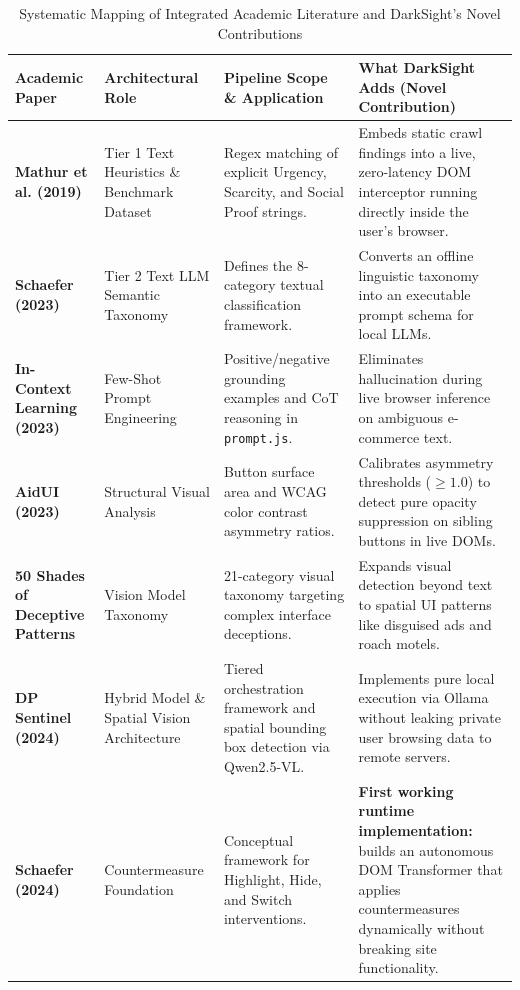 \documentclass[11pt,a4paper]{article}
\begin{document}
\begin{table}[htbp]
\centering
\small
\caption{Systematic Mapping of Integrated Academic Literature and DarkSight's Novel Contributions}
\label{tab:paper_mapping}
\begin{tabularx}{\textwidth}{|p{3.2cm}|p{3.0cm}|p{4.2cm}|X|}
\hline
\textbf{Academic Paper} & \textbf{Architectural Role} & \textbf{Pipeline Scope \& Application} & \textbf{What DarkSight Adds (Novel Contribution)} \\ \hline
\textbf{Mathur et al. (2019)}~\cite{mathur2019} & Tier 1 Text Heuristics \& Benchmark Dataset & Regex matching of explicit Urgency, Scarcity, and Social Proof strings. & Embeds static crawl findings into a live, zero-latency DOM interceptor running directly inside the user's browser. \\ \hline
\textbf{Schaefer (2023)}~\cite{schaefer2023} & Tier 2 Text LLM Semantic Taxonomy & Defines the 8-category textual classification framework. & Converts an offline linguistic taxonomy into an executable prompt schema for local LLMs. \\ \hline
\textbf{In-Context Learning (2023)}~\cite{incontext2023} & Few-Shot Prompt Engineering & Positive/negative grounding examples and CoT reasoning in \texttt{prompt.js}. & Eliminates hallucination during live browser inference on ambiguous e-commerce text. \\ \hline
\textbf{AidUI (2023)}~\cite{aidui2023} & Structural Visual Analysis & Button surface area and WCAG color contrast asymmetry ratios. & Calibrates asymmetry thresholds ($\ge 1.0$) to detect pure opacity suppression on sibling buttons in live DOMs. \\ \hline
\textbf{50 Shades of Deceptive Patterns}~\cite{50shades} & Vision Model Taxonomy & 21-category visual taxonomy targeting complex interface deceptions. & Expands visual detection beyond text to spatial UI patterns like disguised ads and roach motels. \\ \hline
\textbf{DP Sentinel (2024)}~\cite{dpsentinel2024} & Hybrid Model \& Spatial Vision Architecture & Tiered orchestration framework and spatial bounding box detection via Qwen2.5-VL. & Implements pure local execution via Ollama without leaking private user browsing data to remote servers. \\ \hline
\textbf{Schaefer (2024)}~\cite{schaefer2024} & Countermeasure Foundation & Conceptual framework for Highlight, Hide, and Switch interventions. & \textbf{First working runtime implementation:} builds an autonomous DOM Transformer that applies countermeasures dynamically without breaking site functionality. \\ \hline
\end{tabularx}
\end{table}
\end{document}
